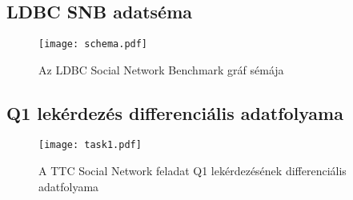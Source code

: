 \appendix
\chapter*{\fuggelek}
\setcounter{chapter}{\appendixnumber}

\section{LDBC SNB adatséma}
\label{sec:snb-sema}

\begin{figure}[h]
	\centering
	\texttt{[image: schema.pdf]}
	\caption{Az LDBC Social Network Benchmark gráf sémája}
	\label{fig:dataschema}
\end{figure}

\section{Q1 lekérdezés differenciális adatfolyama}
\label{sec:q1-ddf}

\begin{figure}[h]
	\centering
	\texttt{[image: task1.pdf]}
	\caption{A TTC Social Network feladat Q1 lekérdezésének differenciális adatfolyama}
	\label{fig:q1-ddffig}
\end{figure}